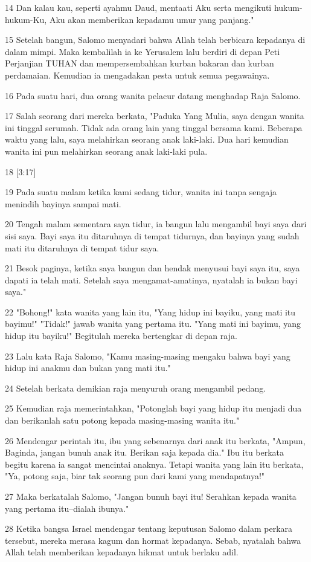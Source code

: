 \par 14 Dan kalau kau, seperti ayahmu Daud, mentaati Aku serta mengikuti hukum-hukum-Ku, Aku akan memberikan kepadamu umur yang panjang."
\par 15 Setelah bangun, Salomo menyadari bahwa Allah telah berbicara kepadanya di dalam mimpi. Maka kembalilah ia ke Yerusalem lalu berdiri di depan Peti Perjanjian TUHAN dan mempersembahkan kurban bakaran dan kurban perdamaian. Kemudian ia mengadakan pesta untuk semua pegawainya.
\par 16 Pada suatu hari, dua orang wanita pelacur datang menghadap Raja Salomo.
\par 17 Salah seorang dari mereka berkata, "Paduka Yang Mulia, saya dengan wanita ini tinggal serumah. Tidak ada orang lain yang tinggal bersama kami. Beberapa waktu yang lalu, saya melahirkan seorang anak laki-laki. Dua hari kemudian wanita ini pun melahirkan seorang anak laki-laki pula.
\par 18 [3:17]
\par 19 Pada suatu malam ketika kami sedang tidur, wanita ini tanpa sengaja menindih bayinya sampai mati.
\par 20 Tengah malam sementara saya tidur, ia bangun lalu mengambil bayi saya dari sisi saya. Bayi saya itu ditaruhnya di tempat tidurnya, dan bayinya yang sudah mati itu ditaruhnya di tempat tidur saya.
\par 21 Besok paginya, ketika saya bangun dan hendak menyusui bayi saya itu, saya dapati ia telah mati. Setelah saya mengamat-amatinya, nyatalah ia bukan bayi saya."
\par 22 "Bohong!" kata wanita yang lain itu, "Yang hidup ini bayiku, yang mati itu bayimu!" "Tidak!" jawab wanita yang pertama itu. "Yang mati ini bayimu, yang hidup itu bayiku!" Begitulah mereka bertengkar di depan raja.
\par 23 Lalu kata Raja Salomo, "Kamu masing-masing mengaku bahwa bayi yang hidup ini anakmu dan bukan yang mati itu."
\par 24 Setelah berkata demikian raja menyuruh orang mengambil pedang.
\par 25 Kemudian raja memerintahkan, "Potonglah bayi yang hidup itu menjadi dua dan berikanlah satu potong kepada masing-masing wanita itu."
\par 26 Mendengar perintah itu, ibu yang sebenarnya dari anak itu berkata, "Ampun, Baginda, jangan bunuh anak itu. Berikan saja kepada dia." Ibu itu berkata begitu karena ia sangat mencintai anaknya. Tetapi wanita yang lain itu berkata, "Ya, potong saja, biar tak seorang pun dari kami yang mendapatnya!"
\par 27 Maka berkatalah Salomo, "Jangan bunuh bayi itu! Serahkan kepada wanita yang pertama itu--dialah ibunya."
\par 28 Ketika bangsa Israel mendengar tentang keputusan Salomo dalam perkara tersebut, mereka merasa kagum dan hormat kepadanya. Sebab, nyatalah bahwa Allah telah memberikan kepadanya hikmat untuk berlaku adil.


